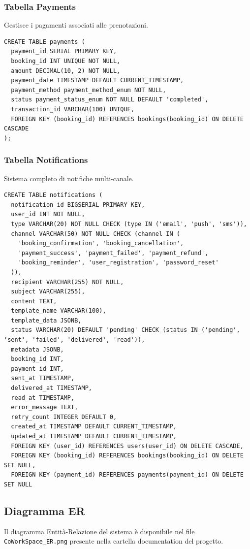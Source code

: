 \subsubsection{Tabella Payments}
Gestisce i pagamenti associati alle prenotazioni.

\begin{lstlisting}[caption=Struttura Tabella Payments]
CREATE TABLE payments (
  payment_id SERIAL PRIMARY KEY,
  booking_id INT UNIQUE NOT NULL,
  amount DECIMAL(10, 2) NOT NULL,
  payment_date TIMESTAMP DEFAULT CURRENT_TIMESTAMP,
  payment_method payment_method_enum NOT NULL,
  status payment_status_enum NOT NULL DEFAULT 'completed',
  transaction_id VARCHAR(100) UNIQUE,
  FOREIGN KEY (booking_id) REFERENCES bookings(booking_id) ON DELETE CASCADE
);
\end{lstlisting}

\subsubsection{Tabella Notifications}
Sistema completo di notifiche multi-canale.

\begin{lstlisting}[caption=Struttura Tabella Notifications (parte 1)]
CREATE TABLE notifications (
  notification_id BIGSERIAL PRIMARY KEY,
  user_id INT NOT NULL,
  type VARCHAR(20) NOT NULL CHECK (type IN ('email', 'push', 'sms')),
  channel VARCHAR(50) NOT NULL CHECK (channel IN (
    'booking_confirmation', 'booking_cancellation', 
    'payment_success', 'payment_failed', 'payment_refund',
    'booking_reminder', 'user_registration', 'password_reset'
  )),
  recipient VARCHAR(255) NOT NULL,
  subject VARCHAR(255),
  content TEXT,
  template_name VARCHAR(100),
  template_data JSONB,
  status VARCHAR(20) DEFAULT 'pending' CHECK (status IN ('pending', 'sent', 'failed', 'delivered', 'read')),
  metadata JSONB,
  booking_id INT,
  payment_id INT,
  sent_at TIMESTAMP,
  delivered_at TIMESTAMP,
  read_at TIMESTAMP,
  error_message TEXT,
  retry_count INTEGER DEFAULT 0,
  created_at TIMESTAMP DEFAULT CURRENT_TIMESTAMP,
  updated_at TIMESTAMP DEFAULT CURRENT_TIMESTAMP,
  FOREIGN KEY (user_id) REFERENCES users(user_id) ON DELETE CASCADE,
  FOREIGN KEY (booking_id) REFERENCES bookings(booking_id) ON DELETE SET NULL,
  FOREIGN KEY (payment_id) REFERENCES payments(payment_id) ON DELETE SET NULL
\end{lstlisting}

\subsection{Diagramma ER}
Il diagramma Entità-Relazione del sistema è disponibile nel file \texttt{CoWorkSpace\_ER.png} presente nella cartella documentation del progetto.

